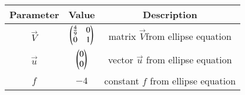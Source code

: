 
\begin{tabular}[]{|c|c|c|}
\hline
Parameter	& Value	& Description \\ \hline
$\vec{V}$	& $\begin{pmatrix}\frac{4}{9}&0\\0&1\end{pmatrix}$ & matrix $\vec{V}$from ellipse equation \\ \hline
$\vec{u}$	& $\begin{pmatrix}0\\0\end{pmatrix}$ & vector $\vec{u}$ from ellipse equation\\ \hline
$f$		& $ -4 $ & constant $f$ from ellipse equation\\ \hline
\end{tabular}
